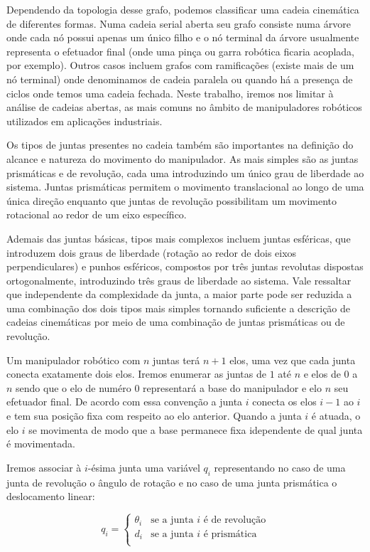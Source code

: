 Dependendo da topologia desse grafo, podemos classificar uma cadeia cinemática
de diferentes formas. Numa cadeia serial aberta seu grafo consiste numa árvore
onde cada nó possui apenas um único filho e o nó terminal da árvore usualmente
representa o efetuador final (onde uma pinça ou garra robótica ficaria
acoplada, por exemplo). Outros casos incluem grafos com ramificações (existe
mais de um nó terminal) onde denominamos de cadeia paralela ou quando há a
presença de ciclos onde temos uma cadeia fechada. Neste trabalho, iremos nos
limitar à análise de cadeias abertas, as mais comuns no âmbito de manipuladores
robóticos utilizados em aplicações industriais.

Os tipos de juntas presentes no cadeia também são importantes na definição do
alcance e natureza do movimento do manipulador. As mais simples são as juntas
prismáticas e de revolução, cada uma introduzindo um único grau de liberdade ao
sistema. Juntas prismáticas permitem o movimento translacional ao longo de uma
única direção enquanto que juntas de revolução possibilitam um movimento
rotacional ao redor de um eixo específico.

Ademais das juntas básicas, tipos mais complexos incluem juntas esféricas, que
introduzem dois graus de liberdade (rotação ao redor de dois eixos
perpendiculares) e punhos esféricos, compostos por três juntas revolutas
dispostas ortogonalmente, introduzindo três graus de liberdade ao sistema. Vale
ressaltar que independente da complexidade da junta, a maior parte pode ser
reduzida a uma combinação dos dois tipos mais simples tornando suficiente a
descrição de cadeias cinemáticas por meio de uma combinação de juntas
prismáticas ou de revolução.

Um manipulador robótico com $n$ juntas terá $n + 1$ elos, uma vez que cada
junta conecta exatamente dois elos. Iremos enumerar as juntas de $1$ até $n$ e
elos de $0$ a $n$ sendo que o elo de numéro $0$ representará a base do
manipulador e elo $n$ seu efetuador final. De acordo com essa convenção a junta
$i$ conecta os elos $i - 1$ ao $i$ e tem sua posição fixa com respeito ao elo
anterior. Quando a junta $i$ é atuada, o elo $i$ se movimenta de modo que a
base permanece fixa idependente de qual junta é movimentada.

Iremos associar à $i$-ésima junta uma variável $q_i$ representando no caso de
uma junta de revolução o ângulo de rotação e no caso de uma junta prismática o
deslocamento linear:

\begin{equation}
    q_i =
    \begin{cases}
        \theta_i & \text{se a junta $i$ é de revolução} \\
        d_i      & \text{se a junta $i$ é prismática}   \\
    \end{cases}
\end{equation}

